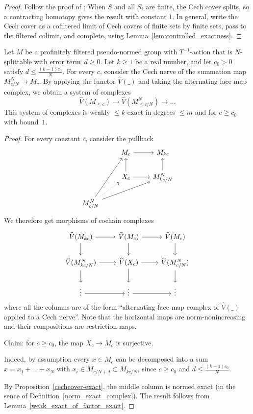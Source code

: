 \begin{proof}
  \leanok
Follow the proof of \cite[Theorem 3.3]{Condensed}: When $S$ and all $S_i$ are finite, the Cech cover splits, so a contracting homotopy gives the result with constant $1$. In general, write the Cech cover as a cofiltered limit of Cech covers of finite sets by finite sets, pass to the filtered colimit, and complete, using Lemma~\ref{lem:controlled_exactness}.
\end{proof}

\begin{lemma}
  \label{pre_col_exact}
  \leanok
  Let $M$ be a profinitely filtered pseudo-normed group with $T^{-1}$-action
  that is $N$-splittable with error term~$d \ge 0$.
  Let $k \ge 1$ be a real number,
  and let $c_0 > 0$ satisfy $d \le \frac{(k - 1) c_0}{N}$.
  For every $c$, consider the Cech nerve of the summation map $M^N_{c/N} \to M_c$.
  By applying the functor $\hat V(\_)$ and taking the alternating face map complex,
  we obtain a system of complexes
  \[
    \hat V(M_{\le c}) \to \hat V(M^N_{\le c/N}) \to \dots
  \]
  This system of complexes
  is weakly $\le k$-exact in degrees $\le m$ and for $c \ge c_0$ with bound~$1$.
\end{lemma}

\begin{proof}
  \leanok
  For every constant $c$,
  consider the pullback
  \[
    \begin{tikzcd}
      & M_c \rar & M_{kc} \\
      & X_c \uar \rar & M^N_{kc/N} \uar \\
      M^N_{c/N} \ar{uur} \ar{rru} \ar[dotted]{ur}
    \end{tikzcd}
  \]
  We therefore get morphisms of cochain complexes
  \[
    \begin{tikzcd}
      \hat V(M_{kc}) \rar\dar & \hat V(M_c) \rar\dar & \hat V(M_c) \dar \\
      \hat V(M^N_{kc/N}) \rar\dar & \hat V(X_c) \rar\dar & \hat V(M^N_{c/N}) \dar \\
      \vdots \rar & \vdots \rar & \vdots
    \end{tikzcd}
  \]
  where all the columns are of the form
  ``alternating face map complex of $\hat V(\_)$ applied to a Cech nerve''.
  Note that the horizontal maps are norm-nonincreasing
  and their compositions are restriction maps.

  Claim: for $c \ge c_0$, the map $X_c \to M_c$ is surjective.

  Indeed, by assumption every $x \in M_c$ can be decomposed into a sum
  $x = x_1 + \dots + x_N$ with $x_i \in M_{c/N+d} \subset M_{kc/N}$,
  since $c \ge c_0$ and $d \le \frac{(k-1)c_0}{N}$.

  By Proposition~\ref{cechcover-exact},
  the middle column is normed exact (in the sence of Definition~\ref{norm_exact_complex}).
  The result follows from Lemma~\ref{weak_exact_of_factor_exact}.
\end{proof}

